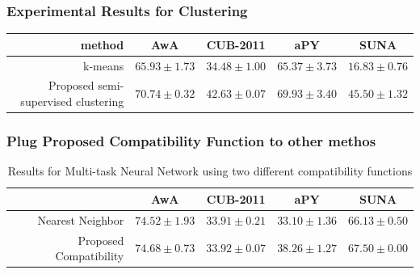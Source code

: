 \documentclass{beamer}
\begin{document}
\begin{frame}[noframenumbering]\frametitle{Experimental Results for Clustering}
  \begin{table}[ht]
  \centering
    \label{tab:clustering}
    {\scriptsize
  \begin{tabular}{|r|c|c|c|c|}
  \hline
method & AwA & CUB-2011 & aPY & SUNA \\
  \hline
  k-means                             &  ${65.93 \pm 1.73}$                 & ${34.48 \pm 1.00}$           & ${65.37 \pm 3.73 }$               & ${16.83 \pm 0.76 }$   \\
  \hline
{\tiny Proposed semi-supervised clustering}
                        & \textbf{${70.74\pm 0.32}$}  & \textbf{${42.63\pm 0.07}$} & \textbf{${69.93\pm 3.40}$} & \textbf{ ${45.50 \pm 1.32}$} \\
  \hline
  \end{tabular}
  }
  \vspace{2mm}
  \end{table}
\end{frame}


\begin{frame}[noframenumbering]\frametitle{Plug Proposed Compatibility Function to other methos}
  \begin{table}[t]
\caption{Results for Multi-task Neural Network using two different compatibility functions}
\label{tab:nn_comp}
\begin{center}
  {\footnotesize
\begin{tabular}{|r|c|c|c|c|}
\hline
  & AwA & CUB-2011 & aPY & SUNA \\
\hline
Nearest Neighbor
                & {${74.52 \pm 1.93}$}  & {${33.91 \pm 0.21}$} & ${33.10 \pm 1.36}$ & { ${66.13 \pm 0.50}$} \\ \hline
Proposed Compatibility
                      & $74.68 \pm 0.73$  & \textbf{${33.92 \pm 0.07}$} & \textbf{${38.26 \pm 1.27}$} & \textbf{ ${67.50 \pm 0.00}$} \\ \hline
\end{tabular}
}
\end{center}
\end{table}
\end{frame}
\end{document}
